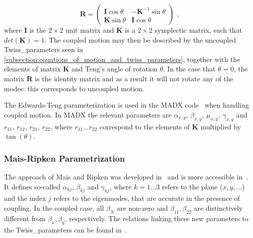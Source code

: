 \begin{equation}
    \mathbf{R} =\left(
        \begin{array}{cc}
            \mathbf{I} \cos \theta & -\mathbf{K}^{-1} \sin \theta \\
            \mathbf{K} \sin \theta & \mathbf{I} \cos \theta
    \end{array} \right) \text{ ,}
    \label{equation:edwards_teng_rotation_matrix}
\end{equation}
where \(\mathbf{I}\) is the \(2 \times 2\) unit matrix and \(\mathbf{K}\) is a \(2 \times 2\) symplectic matrix, such that \(det(\mathbf{K}) = 1\).
The coupled motion may then be described by the uncoupled \gls{Twiss_parameters} seen in \cref{subsection:equations_of_motion_and_twiss_parameters}, together with the elements of matrix \(\mathbf{K}\) and Teng's angle of rotation \(\theta\).
In the case that \(\theta = 0\), the matrix \(\mathbf{R}\) is the identity matrix and as a result it will not rotate any of the modes: this corresponds to uncoupled motion.

The Edwards-Teng parameterization is used in the \gls{MADX} code~\cite{CODE:MADX_guide} when handling coupled motion.
In \gls{MADX} the relevant parameters are \(\alpha_{x, y}\), \(\beta_{x, y}\), \(\mu_{x, y}\), \(\gamma_{x, y}\) and \(r_{11}\), \(r_{12}\), \(r_{21}\), \(r_{22}\), where \(r_{11} \ldots r_{22}\) correspond to the elements of \(\mathbf{K}\) multiplied by \(\tan(\theta)\).

\subsubsection*{Mais-Ripken Parametrization}

The approach of Mais and Ripken was developed in~\cite{REPORT:Ripken:AllGerman} and is more accessible in~\cite{AIP:Willeke:Methods_Beam_Optics, REPORT:Borchardt:Calculation_Beam_Envelopes}.
It defines so-called  \(\alpha_{kj}\), \(\beta_{kj}\) and \(\gamma_{kj}\), where \(k = 1 \ldots 3\) refers to the plane (\(x, y, \ldots\)) and the index \(j\) refers to the eigenmodes, that are accurate in the presence of coupling.
In the coupled case, all \(\beta_N\) are non-zero and \(\beta_{11}, \beta_{22}\) are distinctively different from \(\beta_x, \beta_y\), respectively.
The relations linking these new parameters to the \gls{Twiss_parameters} can be found in~\cite{IOP:Lebedev:Betatron_Motion_Coupling}.

